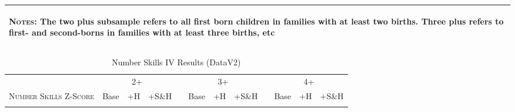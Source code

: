 \begin{landscape}
\begin{table}[htpb!]
\begin{center}
\begin{tabular}{lcccp{2mm}cccp{2mm}ccc}
\midrule\multicolumn{12}{p{19.2cm}}{\begin{footnotesize}\textsc{Notes:} The two plus subsample refers to all first born children in families with at least two births.  Three plus refers to first- and second-borns in families with at least three births, etc\end{footnotesize}} \\ \bottomrule 
\end{tabular}\end{center}\end{table}\end{landscape}\begin{landscape}\begin{table}[htpb!]\caption{Number Skills IV Results (DataV2)}
\label{TWINtab:IVAll}
\begin{center}\begin{tabular}{lcccp{2mm}cccp{2mm}ccc}
\toprule \toprule 
&\multicolumn{3}{c}{2+}&&\multicolumn{3}{c}{3+}&&\multicolumn{3}{c}{4+}\\ \cmidrule(r){2-4} \cmidrule(r){6-8} \cmidrule(r){10-12} 
\textsc{Number Skills Z-Score}&Base&+H&+S\&H&&Base&+H&+S\&H&&Base&+H&+S\&H\\ \midrule 
\begin{footnotesize}\end{footnotesize}& 
\begin{footnotesize}\end{footnotesize}& 
\begin{footnotesize}\end{footnotesize}& 
\begin{footnotesize}\end{footnotesize}& 
\begin{footnotesize}\end{footnotesize}& 
\begin{footnotesize}\end{footnotesize}& 
\begin{footnotesize}\end{footnotesize}& 
\begin{footnotesize}\end{footnotesize}& 
\begin{footnotesize}\end{footnotesize}& 
\begin{footnotesize}\end{footnotesize}& 
\begin{footnotesize}\end{footnotesize}& 
\begin{footnotesize}\end{footnotesize}\\ 

\end{tabular}
\end{center}
\end{table}
\end{landscape}
